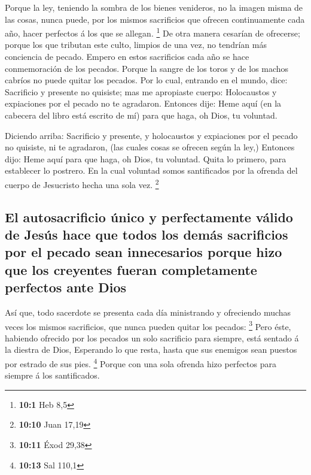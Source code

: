  Porque la ley, teniendo la sombra de los bienes
venideros, no la imagen misma de las cosas, nunca puede, por los mismos
sacrificios que ofrecen continuamente cada año, hacer perfectos á los
que se allegan. \footnote{\textbf{10:1} Heb 8,5}  De otra
manera cesarían de ofrecerse; porque los que tributan este culto,
limpios de una vez, no tendrían más conciencia de pecado. 
Empero en estos sacrificios cada año se hace conmemoración de los
pecados.  Porque la sangre de los toros y de los machos
cabríos no puede quitar los pecados.  Por lo cual,
entrando en el mundo, dice: Sacrificio y presente no quisiste; mas me
apropiaste cuerpo:  Holocaustos y expiaciones por el
pecado no te agradaron.  Entonces dije: Heme aquí (en la
cabecera del libro está escrito de mí) para que haga, oh Dios, tu
voluntad.

 Diciendo arriba: Sacrificio y presente, y holocaustos y
expiaciones por el pecado no quisiste, ni te agradaron, (las cuales
cosas se ofrecen según la ley,)  Entonces dijo: Heme aquí
para que haga, oh Dios, tu voluntad. Quita lo primero, para establecer
lo postrero.  En la cual voluntad somos santificados por
la ofrenda del cuerpo de Jesucristo hecha una sola vez. \footnote{\textbf{10:10}
  Juan 17,19}

\hypertarget{el-autosacrificio-uxfanico-y-perfectamente-vuxe1lido-de-jesuxfas-hace-que-todos-los-demuxe1s-sacrificios-por-el-pecado-sean-innecesarios-porque-hizo-que-los-creyentes-fueran-completamente-perfectos-ante-dios}{%
\subsection{El autosacrificio único y perfectamente válido de Jesús hace
que todos los demás sacrificios por el pecado sean innecesarios porque
hizo que los creyentes fueran completamente perfectos ante
Dios}\label{el-autosacrificio-uxfanico-y-perfectamente-vuxe1lido-de-jesuxfas-hace-que-todos-los-demuxe1s-sacrificios-por-el-pecado-sean-innecesarios-porque-hizo-que-los-creyentes-fueran-completamente-perfectos-ante-dios}}

 Así que, todo sacerdote se presenta cada día ministrando
y ofreciendo muchas veces los mismos sacrificios, que nunca pueden
quitar los pecados: \footnote{\textbf{10:11} Éxod 29,38} 
Pero éste, habiendo ofrecido por los pecados un solo sacrificio para
siempre, está sentado á la diestra de Dios,  Esperando lo
que resta, hasta que sus enemigos sean puestos por estrado de sus pies.
\footnote{\textbf{10:13} Sal 110,1}  Porque con una sola
ofrenda hizo perfectos para siempre á los santificados.

